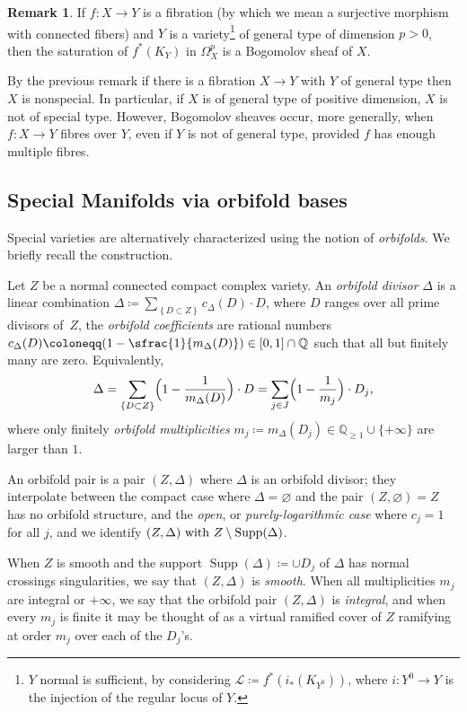\documentclass[JEP,XML,SOM,Unicode, NoEqCountersInSection,NoFloatCountersInSection,published]{cedram}
\let\mathcal\mathscr
\DeclareMathOperator{\Supp}{Supp}
\theoremstyle{theorem}
\theoremstyle{definition}
\newtheorem{remark}[proposition]{Remark}
\def\bQ{{\mathbb Q}}
\newcommand{\calL}{{\mathcal L}}
\newcommand{\bydef}{\coloneqq}
\begin{document}
\begin{remark}
If \(f\colon X\to Y\) is a fibration (by which we mean a surjective morphism with connected fibers) and \(Y\) is a variety\footnote{$Y$ normal is sufficient, by considering $\calL\coloneqq f^*(i_*(K_{Y^0}))$, where $i:Y^0\to Y$ is the injection of the regular locus of $Y$.} of general type of dimension \(p>0\), then the saturation of \(f^*(K_Y)\) in \(\Omega^p_X\) is a Bogomolov sheaf of \(X\).
\end{remark}

By the previous remark if there is a fibration $X \to Y$ with $Y$ of general type then~$X$ is nonspecial. In particular, if \(X\) is of general type of positive dimension, $X$ is not of special type.
However, Bogomolov sheaves occur, more generally, when $f:X\to Y$ fibres over $Y$, even if $Y$ is not of general type, provided $f$ has enough multiple fibres.

\subsection{Special Manifolds via orbifold bases}

Special varieties are alternatively characterized using the notion of \emph{orbifolds}. We briefly recall the construction.

Let $Z$ be a normal connected compact complex variety.
An \emph{orbifold divisor} \(\Delta\) is a linear combination \(\Delta\coloneqq\sum_{\left\{D\subset Z\right\}}c_{\Delta}(D)\cdot D\),
where \(D\) ranges over all prime divisors of~\(Z\),
the \emph{orbifold coefficients} are rational numbers \(c_{\Delta}(D)\coloneqq (1-\sfrac{1}{m_{\Delta}(D)})\in[0,1]\cap\bQ\) such that all but finitely many are zero.
Equivalently,
\[
\Delta
=
\sum_{\{D\subset Z\}}
\Bigl(
1-\frac{1}{m_{\Delta}(D)}
\Bigr)
\cdot
D=\sum_{j\in J} \Bigl(
1-\frac{1}{m_j}
\Bigr)
\cdot
D_j,
\]
where only finitely \emph{orbifold multiplicities} \(m_j\coloneqq m_{\Delta}(D_j)\in\bQ_{\geq 1}\cup \{+\infty\}\) are larger than \(1\).

An orbifold pair is a pair \((Z,\Delta)\) where $\Delta$ is an orbifold divisor; they interpolate between the compact case where \(\Delta=\varnothing\) and the pair \((Z,\varnothing)=Z\) has no orbifold structure, and the {\it open}, or {\it purely-logarithmic case} where $c_j = 1$ for all $j$, and we identify \((Z,\Delta)$ with $Z\setminus\Supp(\Delta)\).

When \(Z\) is smooth and the support \(\Supp(\Delta)\bydef\cup D_j\) of \(\Delta\) has normal crossings singularities, we say that \((Z,\Delta)\) is {\it smooth}. When all multiplicities \(m_j\) are integral or \(+\infty\), we say that the orbifold pair \((Z,\Delta)\) is {\it integral}, and when every $m_j$ is finite it may be thought of as a virtual ramified cover of \(Z\) ramifying at order \(m_j\) over each of the \(D_j\)'s.
\end{document}
